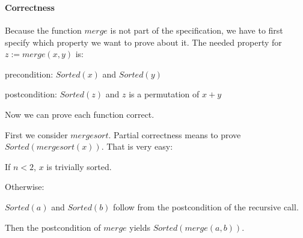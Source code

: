 \begin{acode}
\\
\\
\end{acode}

\paragraph{Correctness}
Because the function $merge$ is not part of the specification, we have to first specify which property we want to prove about it.
The needed property for $z:=merge(x,y)$ is:
 \begin{compactitem}
   \item precondition: $Sorted(x)$ and $Sorted(y)$
   \item postcondition: $Sorted(z)$ and $z$ is a permutation of $x+y$
 \end{compactitem}

Now we can prove each function correct.
\medskip

First we consider $mergesort$.
Partial correctness means to prove $Sorted(mergesort(x))$.
That is very easy:
\begin{compactitem}
  \item If $n<2$, $x$ is trivially sorted.
  \item Otherwise:
   \begin{compactitem}
     \item $Sorted(a)$ and $Sorted(b)$ follow from the postcondition of the recursive call.
     \item Then the postcondition of $merge$ yields $Sorted(merge(a,b))$.
   \end{compactitem}
\end{compactitem}

